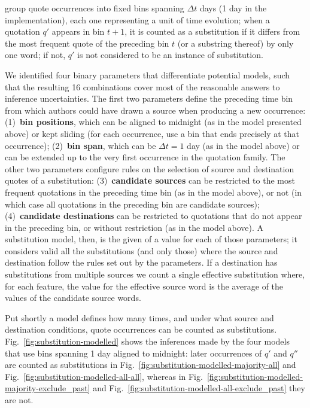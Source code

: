 group quote occurrences into fixed bins spanning $\Delta t$ days (1 day in the implementation), each one representing a unit of time evolution;
when a quotation $q'$ appears in bin $t+1$, it is counted as a substitution if it differs from the most frequent quote of the preceding bin $t$ (or a substring thereof) by only one word;
if not, $q'$ is not considered to be an instance of substitution.

\begin{new}

We identified four binary parameters that differentiate potential models, such that the resulting 16 combinations cover most of the reasonable answers to inference uncertainties.
The first two parameters define the preceding time bin from which authors could have drawn a source when producing a new occurrence:
(1)~\textbf{bin positions}, which can be aligned to midnight (as in the model presented above) or kept sliding (for each occurrence, use a bin that ends precisely at that occurrence);
(2)~\textbf{bin span}, which can be $\Delta t=1$ day (as in the model above) or can be extended up to the very first occurrence in the quotation family.
The other two parameters configure rules on the selection of source and destination quotes of a substitution:
(3)~\textbf{candidate sources} can be restricted to the most frequent quotations in the preceding time bin (as in the model above), or not (in which case all quotations in the preceding bin are candidate sources);
(4)~\textbf{candidate destinations} can be restricted to quotations that do not appear in the preceding bin, or without restriction (as in the model above).
A substitution model, then, is the given of a value for each of those parameters;
it considers valid all the substitutions (and only those) where the source and destination follow the rules set out by the parameters.
If a destination has substitutions from multiple sources we count a single effective substitution where, for each feature, the value for the effective source word is the average of the values of the candidate source words.


Put shortly a model defines how many times, and under what source and destination conditions, quote occurrences can be counted as substitutions.
Fig.~\ref{fig:substitution-modelled} shows the inferences made by the four models that use bins spanning 1 day aligned to midnight:
later occurrences of $q'$ and $q''$ are counted as substitutions in Fig.~\ref{fig:substitution-modelled-majority-all} and Fig.~\ref{fig:substitution-modelled-all-all}, whereas in Fig.~\ref{fig:substitution-modelled-majority-exclude_past} and Fig.~\ref{fig:substitution-modelled-all-exclude_past} they are not.


\end{new}
